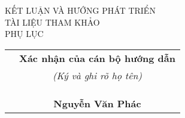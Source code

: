 \documentclass[11pt,a4paper]{article}
\begin{document}
    \noindent 
    \vspace{5pt}KẾT LUẬN VÀ HƯỚNG PHÁT TRIỂN\\\vspace{5pt}TÀI LIỆU THAM KHẢO\\PHỤ LỤC
    
    \vspace{1cm}
    \fontsize{12}{0} 
    \begin{tabular}{ m{8cm} c }
        & \textbf{Xác nhận của cán bộ hướng dẫn}\\
        & \textit{(Ký và ghi rõ họ tên)}\\
        &\\ &\\ &\\ 
        & \textbf{Nguyễn Văn Phác}
    \end{tabular}
\end{document}
